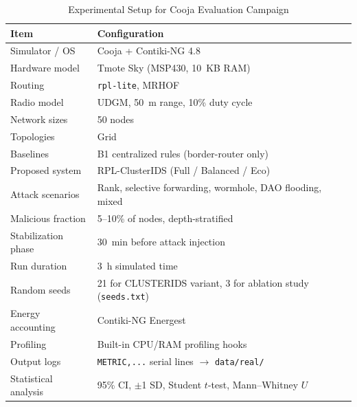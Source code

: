 \begin{table}[!t]
  \caption{Experimental Setup for Cooja Evaluation Campaign}
  \label{tab:experimental-setup}
  \centering
  \scriptsize
  \setlength{\tabcolsep}{4pt}
  \renewcommand{\arraystretch}{1.1}
  \begin{tabular}{@{}ll@{}}
    \toprule
    \textbf{Item} & \textbf{Configuration} \\
    \midrule
    Simulator / OS       & Cooja + Contiki-NG 4.8 \\
    Hardware model       & Tmote Sky (MSP430, 10~KB RAM) \\
    Routing              & \texttt{rpl-lite}, MRHOF \\
    Radio model          & UDGM, 50~m range, 10\% duty cycle \\
    Network sizes        & 50 nodes \\
    Topologies           & Grid \\
    Baselines            & B1 centralized rules (border-router only) \\
    Proposed system      & RPL-ClusterIDS (Full / Balanced / Eco) \\
    Attack scenarios     & Rank, selective forwarding, wormhole, DAO flooding, mixed \\
    Malicious fraction   & 5--10\% of nodes, depth-stratified \\
    Stabilization phase  & 30~min before attack injection \\
    Run duration         & 3~h simulated time \\
    Random seeds         & 21 for CLUSTERIDS variant, 3 for ablation study (\texttt{seeds.txt}) \\
    Energy accounting    & Contiki-NG Energest \\
    Profiling            & Built-in CPU/RAM profiling hooks \\
    Output logs          & \texttt{METRIC,...} serial lines $\rightarrow$ \texttt{data/real/} \\
    Statistical analysis & 95\% CI, $\pm$1 SD, Student $t$-test, Mann--Whitney $U$ \\
    \bottomrule
  \end{tabular}
\end{table}
